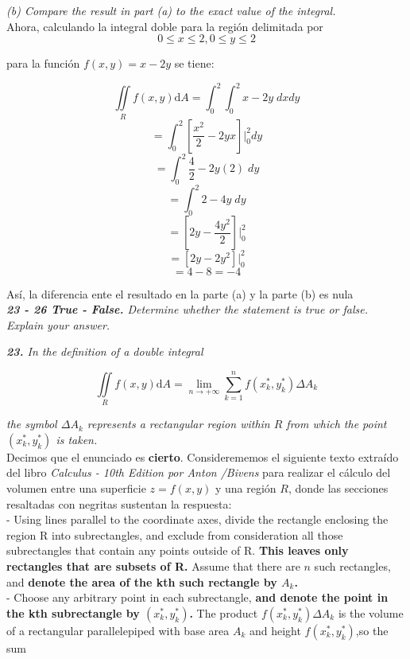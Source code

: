 \documentclass[a4paper,12pt]{article}
\begin{document}
	\textit{ (b) Compare the result in part (a) to the exact value of the integral. }\\

		Ahora, calculando la integral doble para la región delimitada por
		$$ 0 \leq x \leq 2, 0 \leq y \leq 2  $$

		para la función $ f(x,y) = x - 2y $ se tiene:

		$$ \iint\limits_{R} f(x,y)\mathrm{d}A = \int_{0}^{2} \int_{0}^{2} x - 2y \; dx dy  $$
		$$  = \int_{0}^{2} [ \frac{x^2}{2} -2yx] \Big|_0^2 dy $$
		$$  = \int_{0}^{2} \frac{4}{2} -2y(2) \; dy $$
		$$  = \int_{0}^{2} 2 - 4y \; dy $$
		$$  = [ 2y - \frac{4y^2}{2}] \Big|_0^2 $$
		$$  = [ 2y - 2y^2 ] \Big|_0^2 $$
		$$  = 4 - 8  = - 4 $$

		Así, la diferencia ente el resultado en la parte (a) y la parte (b) es nula\\

	\textit{\textbf{23 - 26 True - False.} Determine whether the statement is
	true or false. Explain your answer.\\}

	\textit{\textbf{23.} In the definition of a double integral}

		$$  \iint\limits_{R} f(x,y)\mathrm{d}A = \lim\limits_{n \rightarrow + \infty}
		 	\sum_{k=1}^{n} f(x^{*}_{k}, y^{*}_{k}) \Delta A_{k} $$

	\textit{ the symbol $ \Delta A_{k}$ represents a rectangular region within $R$
	 		from which the point $ (x^{*}_{k}, y^{*}_{k}) $ is taken.}\\

	Decimos que el enunciado es \textbf{cierto}. Considerememos el siguiente texto extraído
	del libro \textit{Calculus - 10th Edition por Anton /Bivens} para realizar el
	cálculo del volumen entre una superficie $ z = f(x,y)$ y una región $R$, donde
	las secciones resaltadas con negritas sustentan la respuesta: \\

	- Using lines parallel to the coordinate axes, divide the rectangle
	enclosing the region R into subrectangles, and exclude from consideration
	all those subrectangles that contain any points outside of R.
	\textbf{This leaves only rectangles that are subsets of R.} Assume that there are $n$
	such rectangles, and \textbf{denote the area of the kth such rectangle by $A_k$.} \\

	- Choose any arbitrary point in each subrectangle, \textbf{and denote the point in
	the kth subrectangle by $ (x^{*}_{k}, y^{*}_{k}) $.} The product
	$ f(x^{*}_{k}, y^{*}_{k}) \Delta A_k$  is the volume of a rectangular
	parallelepiped with base area $A_k$ and height $f(x^{*}_{k}, y^{*}_{k})$,so the sum
\end{document}
